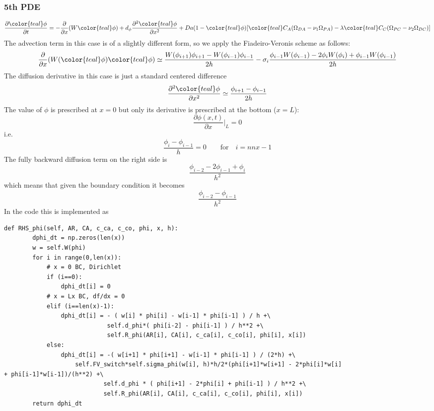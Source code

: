 \documentclass[a4paper]{article}
\newcommand{\nn}{\nonumber}
\begin{document}
\subsubsection*{5th PDE}
\[
\frac{\partial {\color{teal}\phi}}{\partial t} 
= -\frac{\partial}{\partial x} (W {\color{teal}\phi})
+d_{\phi} \frac{\partial^2 {\color{teal}\phi}}{\partial x^2} + Da (1-{\color{teal}\phi})
[{\color{teal}C_A}(\Omega_{DA}-\nu_1 \Omega_{PA})-\lambda 
{\color{teal}C_C} (\Omega_{PC}-\nu_2 \Omega_{DC})] \nn
\]
The advection term in this case is of a slightly different form, so we apply the Fiadeiro-Veronis scheme as follows:
\[
\frac{\partial}{\partial x} (W ({\color{teal}\phi}) {\color{teal}\phi})
\simeq
\frac{W(\phi_{i+1})\phi_{i+1} - W(\phi_{i-1})\phi_{i-1}}{2h} - \sigma_i \frac{\phi_{i-1}W(\phi_{i-1}) - 2 \phi_iW(\phi_i) + \phi_{i-1} W(\phi_{i-1})}{2h}
\]
The diffusion derivative in this case is just a standard centered difference
\[
\frac{\partial^2 {\color{teal}\phi}}{\partial x^2}
\simeq \frac{\phi_{i+1}-\phi_{i-1}}{2h}  
\]
The value of $\phi$ is prescribed at $x=0$ but only its derivative
is prescribed at the bottom ($x=L$):
\[
\frac{\partial \phi (x,t)}{\partial x}|_L = 0
\]
i.e.
\[
\frac{\phi_i-\phi_{i-1}}{h}=0  \qquad \text{for} \quad i=nnx-1
\] 
The fully backward diffusion term on the right side is 
\[
\frac{\phi_{i-2}-2\phi_{i-1}+\phi_i}{h^2}
\]
which means that given the boundary condition it becomes
\[
\frac{\phi_{i-2}-\phi_{i-1}}{h^2}
\]
In the code this is implemented as 
\begin{lstlisting}
def RHS_phi(self, AR, CA, c_ca, c_co, phi, x, h):
        dphi_dt = np.zeros(len(x))
        w = self.W(phi)
        for i in range(0,len(x)):
            # x = 0 BC, Dirichlet
            if (i==0):
                dphi_dt[i] = 0
            # x = Lx BC, df/dx = 0
            elif (i==len(x)-1):
                dphi_dt[i] = - ( w[i] * phi[i] - w[i-1] * phi[i-1] ) / h +\
                             self.d_phi*( phi[i-2] - phi[i-1] ) / h**2 +\
                             self.R_phi(AR[i], CA[i], c_ca[i], c_co[i], phi[i], x[i])
            else:
                dphi_dt[i] = -( w[i+1] * phi[i+1] - w[i-1] * phi[i-1] ) / (2*h) +\
                    self.FV_switch*self.sigma_phi(w[i], h)*h/2*(phi[i+1]*w[i+1] - 2*phi[i]*w[i]                                                                 + phi[i-1]*w[i-1])/(h**2) +\
                            self.d_phi * ( phi[i+1] - 2*phi[i] + phi[i-1] ) / h**2 +\
                            self.R_phi(AR[i], CA[i], c_ca[i], c_co[i], phi[i], x[i])
        return dphi_dt
\end{lstlisting}

\printbibliography
\end{document}
